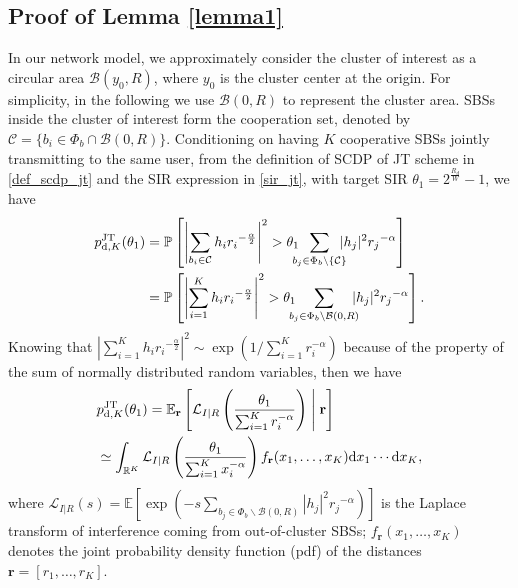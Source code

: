 \documentclass[twocolumns,10pt]{IEEEtran}
\begin{document}
\subsection{Proof of Lemma \ref{lemma1} }
\label{appen1}
In our network model, we approximately consider the cluster of interest as a circular area  $\mathcal{B}(y_0,R)$, where $y_0$ is the cluster center at the origin. For simplicity, in the following we use $\mathcal{B}(0,R)$ to represent the cluster area. SBSs inside the cluster of interest form the cooperation set, denoted by $\mathcal{C}=\{b_i \in \Phi_b \cap \mathcal{B}(0, R)\}$. Conditioning on having $K$ cooperative SBSs jointly transmitting to the same user,  from the definition of SCDP of JT scheme in \eqref{def_scdp_jt} and the SIR expression in  \eqref{sir_jt}, with target SIR $\theta_1=2^{\frac{R_d}{W}}-1$, we have  
\begin{align}
p_{\textnormal{d},K}^{\text{JT}}(\theta_1) &= \mathbb{P}\left[\left|\sum_{b_i\in\mathcal{C}}h_i {r_i}^{-\frac{\alpha}{2}}\right|^2>\theta_1\!\!\!\!\sum\limits_{b_j\in \Phi_b \backslash \{\mathcal{C}\}} \!\!\!\!|h_j|^2 {r_j}^{-\alpha}\right]  \nonumber\\
&= \mathbb{P}\left[\left|\sum_{i=1}^{K}h_i {r_i}^{-\frac{\alpha}{2}}\right|^2>\theta_1\!\!\!\!\sum\limits_{b_j\in \Phi_b \backslash \mathcal{B}(0,R)} \!\!\!\!|h_j|^2 {r_j}^{-\alpha}\right]. 
\end{align}
Knowing that $\left|\sum\limits_{i=1}^{K}h_i {r_i}^{-\frac{\alpha}{2}}\right|^2 \sim \exp\left(1/\sum\limits_{i=1}^{K}r_i^{-\alpha}\right)$ because of the property of the sum of normally distributed random variables, then we have 
\begin{align}
&p_{\textnormal{d},K}^{\text{JT}}(\theta_1) = \mathbb{E}_{\mathbf{r}}\left[ \mathcal{L}_{I|R} \left(\frac{\theta_1}{\sum_{i=1}^{K}r_i^{-\alpha}}\right) \;\middle|\; \mathbf{r}  \right]   \nonumber\\
&\simeq \int_{\mathbb{R}^K}\mathcal{L}_{I|R} \left(\frac{\theta_1}{\sum_{i=1}^{K}x_i^{-\alpha}}\right) f_{\mathbf{r}}(x_1, \ldots, x_K) \text{d}x_1 \cdots \text{d}x_K,
\label{p_jt}
\end{align} 
where $\mathcal{L}_{I|R}(s)=\mathbb{E}\left[\exp\left(-s \sum\limits_{b_j\in \Phi_b \backslash \mathcal{B}(0,R)} |h_j|^2 {r_j}^{-\alpha}\right)\right]$ is the Laplace transform of interference coming from out-of-cluster SBSs; $f_{\mathbf{r}}(x_1, \ldots, x_K) $ denotes the joint probability density function (pdf) of the distances  $\mathbf{r}=[r_1,\ldots,r_K]$. 
\end{document}
